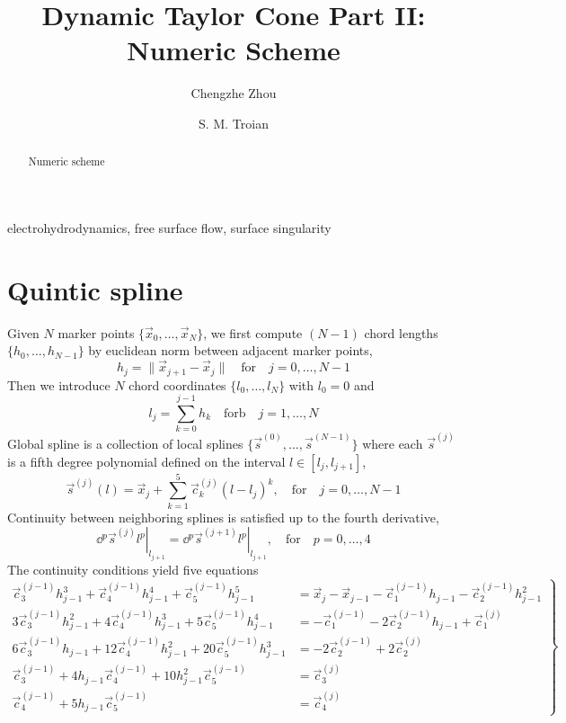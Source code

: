 \documentclass{jfm}
\title{Dynamic Taylor Cone Part II: Numeric Scheme}
\author{ Chengzhe Zhou\aff{1}
 \and S. M. Troian\aff{2}   \corresp{\email{stroian@caltech.edu}}}
\affiliation{\aff{1}Division of Physics, Mathematics and Astronomy, California Institute of Technology,
Pasadena, CA 91125, USA
\aff{2}Department of Applied Physics and Materials Science, 
California Institute of Technology,
Pasadena, CA 91125, USA}
\begin{document}
\maketitle
\begin{abstract}
Numeric scheme \citep{Taylor64}
\end{abstract}

\begin{keywords}
electrohydrodynamics, free surface flow, surface singularity 
\end{keywords}

\section{Quintic spline}
Given $N$ marker points $\{\vec{x}_0,\dots,\vec{x}_N\}$,
we first compute $(N-1)$ chord lengths $\{h_0,\dots,h_{N-1}\}$
by euclidean norm between adjacent marker points,
\begin{equation}
h_j=\|\vec{x}_{j+1}-\vec{x}_{j}\|\quad\textrm{for}\quad j=0,\dots,N-1
\end{equation}
Then we  introduce $N$ chord coordinates $\{l_0,\dots,l_N\}$ with $l_0=0$ and
\begin{equation}
l_j=\sum_{k=0}^{j-1}h_k\quad\textrm{forb}\quad j=1,\dots,N
\end{equation}
Global spline is a collection of local splines $\{\vec{s}^{(0)},\dots,\vec{s}^{(N-1)}\}$
where each $\vec{s}^{(j)}$ is a fifth degree polynomial defined on the interval $l\in[l_j,l_{j+1}]$,
\begin{equation}
\vec{s}^{(j)}(l)=\vec{x}_j+\sum_{k=1}^{5}\vec{c}^{(j)}_k(l-l_j)^k,
\quad\textrm{for}\quad j=0,\dots,N-1
\end{equation}
Continuity between neighboring splines is satisfied up to the fourth derivative,
\begin{equation}
\left.\dd{^{p}\vec{s}^{(j)}}{l^p}\right|_{l_{j+1}}=
\left.\dd{^{p}\vec{s}^{(j+1)}}{l^p}\right|_{l_{j+1}},
\quad\textrm{for}\quad p=0,\dots,4
\end{equation}
The continuity conditions yield five equations
\begin{equation}\left.
\begin{aligned}
\vec{c}^{(j-1)}_3h_{j-1}^3+\vec{c}^{(j-1)}_4h_{j-1}^4+\vec{c}^{(j-1)}_5h_{j-1}^5
&=\vec{x}_j-\vec{x}_{j-1}-\vec{c}^{(j-1)}_1h_{j-1}-\vec{c}^{(j-1)}_2h_{j-1}^2\\
3\vec{c}^{(j-1)}_3h_{j-1}^2+4\vec{c}^{(j-1)}_4h_{j-1}^3+5\vec{c}^{(j-1)}_5h_{j-1}^4
&=-\vec{c}^{(j-1)}_1-2\vec{c}^{(j-1)}_2h_{j-1}+\vec{c}_1^{(j)}\\
6\vec{c}^{(j-1)}_3h_{j-1}+12\vec{c}^{(j-1)}_4h_{j-1}^2+20\vec{c}^{(j-1)}_5h_{j-1}^3
&=-2\vec{c}^{(j-1)}_2+2\vec{c}_2^{(j)}\\
\vec{c}_3^{(j-1)}+4 h_{j-1} \vec{c}_4^{(j-1)}+10 h_{j-1}^2 \vec{c}_5^{(j-1)}
&=\vec{c}_3^{(j)}\\
\vec{c}_4^{(j-1)}+5 h_{j-1} \vec{c}_5^{(j-1)}
&=\vec{c}_4^{(j)}
\end{aligned}\right\}
\end{equation}
\end{document}
